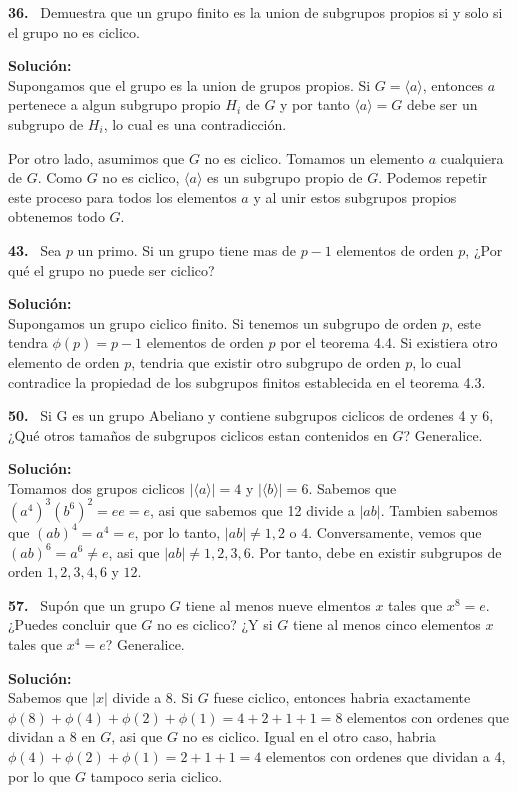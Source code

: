 \documentclass{article}
\newcounter{problem}
\newcounter{solution}
\newcommand\Problem[1]{%
  \stepcounter{problem}%
  \textbf{#1.}~%
  \setcounter{solution}{0}%
}
\newcommand\TheSolution{%
  \textbf{Solución:}\\%
}
\begin{document}
\Problem{36} Demuestra que un grupo finito es la union de subgrupos propios si
y solo si el grupo no es ciclico.

\TheSolution{}
Supongamos que el grupo es la union de grupos propios. Si $G = \langle 
a\rangle$, entonces $a$ pertenece a algun subgrupo propio $H_i$ de $G$ y
por tanto $\langle a \rangle = G$ debe ser un subgrupo de $H_i$, lo cual es
una contradicción.

Por otro lado, asumimos que $G$ no es ciclico. Tomamos un elemento $a$
cualquiera de $G$. Como $G$ no es ciclico, $\langle a \rangle$ es un subgrupo
propio de $G$. Podemos repetir este proceso para todos los elementos $a$ y
al unir estos subgrupos propios obtenemos todo $G$.

\Problem{43} Sea $p$ un primo. Si un grupo tiene mas de $p - 1$ elementos de
orden $p$, ¿Por qué el grupo no puede ser ciclico?

\TheSolution{}
Supongamos un grupo ciclico finito. Si tenemos un subgrupo de orden
$p$, este tendra $\phi(p) = p - 1$ elementos de orden $p$ por el teorema 4.4.
Si existiera otro elemento de orden $p$, tendria que existir otro subgrupo de
orden $p$, lo cual contradice la propiedad de los subgrupos finitos 
establecida en el teorema 4.3.

\Problem{50} Si G es un grupo Abeliano y contiene subgrupos ciclicos de
ordenes 4 y 6, ¿Qué otros tamaños de subgrupos ciclicos estan contenidos en
$G$? Generalice.

\TheSolution{} Tomamos dos grupos ciclicos $|\langle a \rangle| = 4$ y 
$|\langle b\rangle| = 6$. Sabemos que ${(a^4)}^{3}{(b^6)}^2 = ee = e$, asi que
sabemos que 12 divide a $|ab|$. Tambien sabemos que ${(ab)}^{4} = a^4 = e$,
por lo tanto, $|ab| \neq 1, 2$ o $4$. Conversamente, vemos que ${(ab)}^{6} =
a^{6} \neq e$, asi que $|ab| \neq 1, 2, 3, 6$. Por tanto, debe en existir
subgrupos de orden $1, 2, 3, 4, 6$ y $12$.

\Problem{57} Supón que un grupo $G$ tiene al menos nueve elmentos $x$ tales
que $x^8 = e$. ¿Puedes concluir que $G$ no es ciclico? ¿Y si $G$ tiene al
menos cinco elementos $x$ tales que $x^4 = e$? Generalice.

\TheSolution{} Sabemos que $|x|$ divide a $8$. Si $G$ fuese ciclico, entonces
habria exactamente $\phi(8) + \phi(4) + \phi(2) + \phi(1) = 4 + 2 + 1 + 1 = 8$
elementos con ordenes que dividan a $8$ en $G$, asi que $G$ no es ciclico.
Igual en el otro caso, habria $\phi(4) + \phi(2) + \phi(1) = 2 + 1 + 1 = 4$
elementos con ordenes que dividan a 4, por lo que $G$ tampoco seria ciclico.
\end{document}
